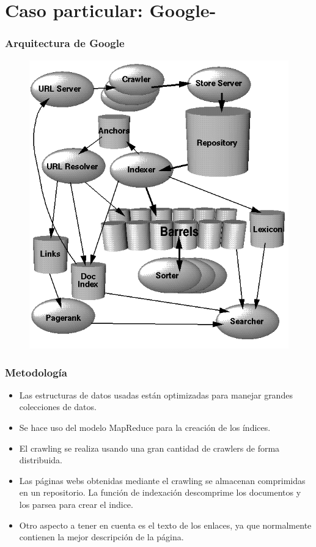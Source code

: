 \documentclass[9pt]{beamer} %
\begin{document}
\section{Caso particular: Google-}
\begin{frame}
	\frametitle{Arquitectura de Google}
	\begin{figure}
	\includegraphics[scale=0.33]{img/google_architecture.png}
\end{figure}
	\end{frame}
\begin{frame}
	\frametitle{Metodología}
\begin{itemize}
	\item Las estructuras de datos usadas están optimizadas para manejar grandes colecciones de datos.
	\item Se hace uso del modelo MapReduce para la creación de los índices.
	\item El crawling se realiza usando una gran cantidad de crawlers de forma distribuida.
	\item Las páginas webs obtenidas mediante el crawling se almacenan comprimidas en un repositorio. La función de indexación descomprime los documentos y los parsea para crear el indice.
	\item Otro aspecto a tener en cuenta es el texto de los enlaces, ya que normalmente contienen la mejor descripción de la página.
\end{itemize}		
\end{frame}
\end{document}
